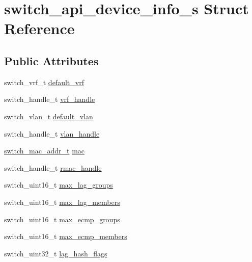 \hypertarget{structswitch__api__device__info__s}{\section{switch\+\_\+api\+\_\+device\+\_\+info\+\_\+s Struct Reference}
\label{structswitch__api__device__info__s}
}
\subsection*{Public Attributes}
\begin{DoxyCompactItemize}
\item 
switch\+\_\+vrf\+\_\+t \hyperlink{structswitch__api__device__info__s_a8397e0e411ce2ba6b33c529ed7f49927}{default\+\_\+vrf}
\item 
switch\+\_\+handle\+\_\+t \hyperlink{structswitch__api__device__info__s_abee10a0fa352b512256c72d305906a9f}{vrf\+\_\+handle}
\item 
switch\+\_\+vlan\+\_\+t \hyperlink{structswitch__api__device__info__s_a355c7d6a12564d76a6d45f5cea341917}{default\+\_\+vlan}
\item 
switch\+\_\+handle\+\_\+t \hyperlink{structswitch__api__device__info__s_a195fea6eeb1f1ee9c0e0e2d22aaf979d}{vlan\+\_\+handle}
\item 
\hyperlink{structswitch__mac__addr__s}{switch\+\_\+mac\+\_\+addr\+\_\+t} \hyperlink{structswitch__api__device__info__s_ac13509ef24f3c9cf2dd64e24bd3d737b}{mac}
\item 
switch\+\_\+handle\+\_\+t \hyperlink{structswitch__api__device__info__s_aeec9bd0c4feaf5dd9650a27b9d6eaf1d}{rmac\+\_\+handle}
\item 
switch\+\_\+uint16\+\_\+t \hyperlink{structswitch__api__device__info__s_ac4b4f3d5f6b50a9bdfe9942c4381bc47}{max\+\_\+lag\+\_\+groups}
\item 
switch\+\_\+uint16\+\_\+t \hyperlink{structswitch__api__device__info__s_a59c6a528e2e720386b439ae99376a8ea}{max\+\_\+lag\+\_\+members}
\item 
switch\+\_\+uint16\+\_\+t \hyperlink{structswitch__api__device__info__s_a69f965827a491ed4500c24759ac9a959}{max\+\_\+ecmp\+\_\+groups}
\item 
switch\+\_\+uint16\+\_\+t \hyperlink{structswitch__api__device__info__s_ae5b7248aae9aa7931b8122c48126e608}{max\+\_\+ecmp\+\_\+members}
\item 
switch\+\_\+uint32\+\_\+t \hyperlink{structswitch__api__device__info__s_a9ea97601dd9946af69c963da088a5887}{lag\+\_\+hash\+\_\+flags}

\end{DoxyCompactItemize}
